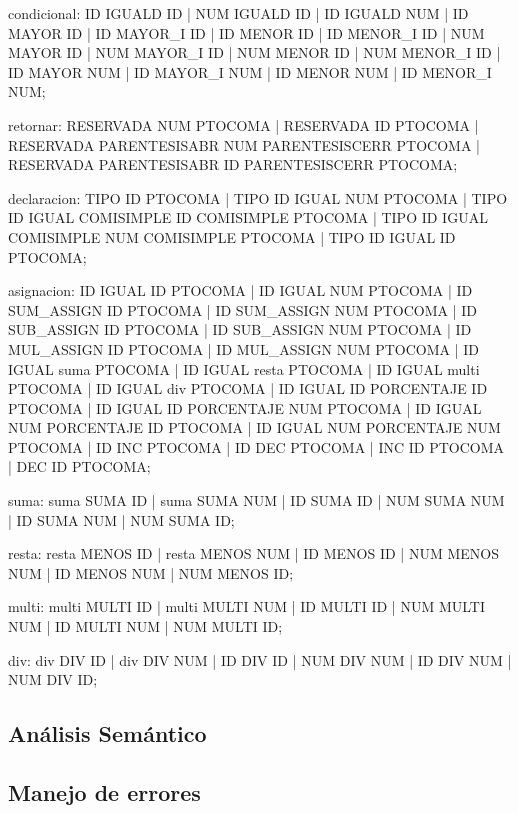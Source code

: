 \documentclass[aspectratio=169]{article}
\begin{document}
condicional:
	ID IGUALD ID | NUM IGUALD ID | ID IGUALD NUM
	|
	ID MAYOR ID | ID MAYOR_I ID | ID MENOR ID | ID MENOR_I ID
	|
	NUM MAYOR ID | NUM MAYOR_I ID | NUM MENOR ID | NUM MENOR_I ID
	|
	ID MAYOR NUM | ID MAYOR_I NUM | ID MENOR NUM | ID MENOR_I NUM;

retornar:
	RESERVADA NUM PTOCOMA | RESERVADA ID PTOCOMA
	|
	RESERVADA PARENTESISABR NUM PARENTESISCERR PTOCOMA | RESERVADA PARENTESISABR ID PARENTESISCERR PTOCOMA;

declaracion:
	TIPO ID PTOCOMA | TIPO ID IGUAL NUM PTOCOMA | TIPO ID IGUAL COMISIMPLE ID COMISIMPLE PTOCOMA
	|
	TIPO ID IGUAL COMISIMPLE NUM COMISIMPLE PTOCOMA | TIPO ID IGUAL ID PTOCOMA;

asignacion:
	ID IGUAL ID PTOCOMA | ID IGUAL NUM PTOCOMA | ID SUM_ASSIGN ID PTOCOMA | ID SUM_ASSIGN NUM PTOCOMA
	|
	ID SUB_ASSIGN ID PTOCOMA | ID SUB_ASSIGN NUM PTOCOMA | ID MUL_ASSIGN ID PTOCOMA | ID MUL_ASSIGN NUM PTOCOMA
	|
	ID IGUAL suma PTOCOMA | ID IGUAL resta PTOCOMA | ID IGUAL multi PTOCOMA | ID IGUAL div PTOCOMA
	|
	ID IGUAL ID PORCENTAJE ID PTOCOMA | ID IGUAL ID PORCENTAJE NUM PTOCOMA | ID IGUAL NUM PORCENTAJE ID PTOCOMA
	|
	ID IGUAL NUM PORCENTAJE NUM PTOCOMA | ID INC PTOCOMA | ID DEC PTOCOMA | INC ID PTOCOMA | DEC ID PTOCOMA;

suma:
	suma SUMA ID | suma SUMA NUM | ID SUMA ID | NUM SUMA NUM | ID SUMA NUM | NUM SUMA ID;

resta:
	resta MENOS ID | resta MENOS NUM | ID MENOS ID | NUM MENOS NUM | ID MENOS NUM | NUM MENOS ID;

multi:
	multi MULTI ID | multi MULTI NUM | ID MULTI ID | NUM MULTI NUM | ID MULTI NUM | NUM MULTI ID;

div:
	div DIV ID | div DIV NUM | ID DIV ID | NUM DIV NUM | ID DIV NUM | NUM DIV ID;



\subsection{An\'alisis Sem\'antico}

\subsection{Manejo de errores}
\end{document}
